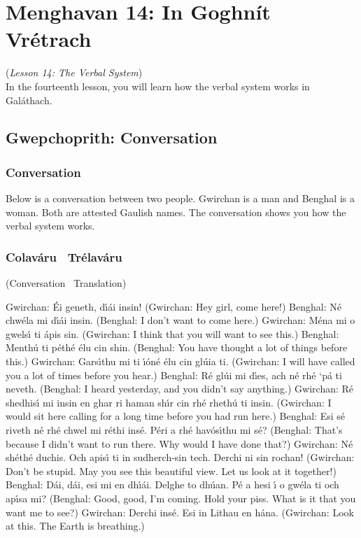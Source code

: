 \section{Menghavan 14: In Goghn\'{i}t Vr\'{e}trach}
(\textit{Lesson 14: The Verbal System})\\

In the fourteenth lesson, you will learn how the verbal system works in Gal\'{a}thach.

\subsection{Gwepchoprith: Conversation}
\subsubsection{Conversation}

Below is a conversation between two people. Gwirchan is a man and Benghal is a woman. Both are attested Gaulish names. The conversation shows you how the verbal system works.


\subsubsection{Colav\'{a}ru \textendash\ Tr\'{e}lav\'{a}ru}
(Conversation \textendash\ Translation)

Gwirchan: \'{E}i geneth, d\'{\i}\'{a}i insin! 
(Gwirchan: Hey girl, come here!)
Benghal: N\'{e} chw\'{e}la mi d\'{\i}\'{a}i insin.
(Benghal: I don't want to come here.)
Gwirchan: M\'{e}na mi o gwels\'{\i} ti \'{a}pis sin.
(Gwirchan: I think that you will want to see this.)
Benghal: Menth\'{u} ti p\'{e}th\'{e} \'{e}lu cin shin.
(Benghal: You have thought a lot of things before this.)
Gwirchan: Gars\'{\i}thu mi ti \'{\i}\'{o}n\'{e} \'{e}lu cin gl\'{u}ia ti.
(Gwirchan: I will have called you a lot of times before you hear.)
Benghal: R\'{e} gl\'{u}i mi d\'{\i}es, ach n\'{e} rh\'{e} ‘p\'{a} ti neveth.
(Benghal: I heard yesterday, and you didn’t say anything.)
Gwirchan: R\'{e} shedhis\'{\i} mi insin en ghar ri haman sh\'{\i}r cin rh\'{e} rheth\'{u} ti insin.
(Gwirchan: I would sit here calling for a long time before you had run here.)
Benghal: Esi s\'{e} riveth n\'{e} rh\'{e} chwel mi r\'{e}thi ins\'{e}. P\'{e}ri a rh\'{e} hav\'{o}s\'{\i}thu mi s\'{e}?
(Benghal: That’s because I didn’t want to run there. Why would I have done that?)
Gwirchan: N\'{e} sh\'{e}th\'{e} duchis. Och apis\'{\i} ti in sudherch-sin tech. Derchi ni sin rochan!
(Gwirchan: Don't be stupid. May you see this beautiful view. Let us look at it together!)
Benghal: D\'{a}i, d\'{a}i, esi mi en dh\'{\i}\'{a}i. Delghe to dh\'{u}an. P\'{e} a hesi \'{\i} o gw\'{e}la ti och ap\'{\i}sa mi?
(Benghal: Good, good, I'm coming. Hold your piss. What is it that you want me to see?)
Gwirchan: Derchi ins\'{e}. Esi in Lithau en h\'{a}na.
(Gwirchan: Look at this. The Earth is breathing.)

